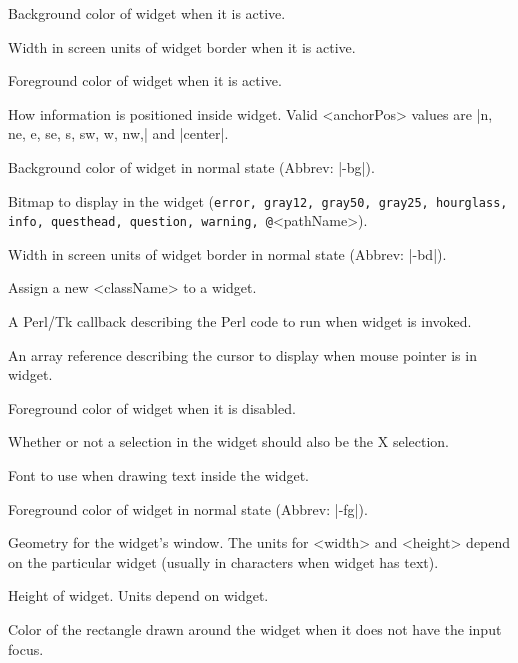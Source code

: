 \begin{enum}{1cm}

Background color of widget when it is active.

Width in screen units of widget border when it is active.

Foreground color of widget when it is active.

How information is positioned inside widget. Valid
<anchorPos> values are |n, ne, e, se, s, sw, w, nw,| and |center|.

Background color of widget in normal state (Abbrev: |-bg|).

Bitmap to display in the widget ({\tt error, gray12, gray50, gray25,
hourglass, info, questhead, question, warning, @}<pathName>).

Width in screen units of widget border in normal state (Abbrev: |-bd|).

Assign a new <className> to a widget.

A Perl/Tk callback describing the Perl code to run when widget is invoked.

An array reference describing the cursor to display when mouse pointer is in widget.

Foreground color of widget when it is disabled.

Whether or not a selection in the widget should also 
be the X selection.

Font to use when drawing text inside the widget.

Foreground color of widget in normal state (Abbrev: |-fg|).

Geometry for the widget's window.  The units for <width> and <height>
depend on the particular widget (usually in characters when widget has text).

Height of widget. Units depend on widget.

Color of the rectangle drawn around the widget when it does not
have the input focus.


\end{enum}
